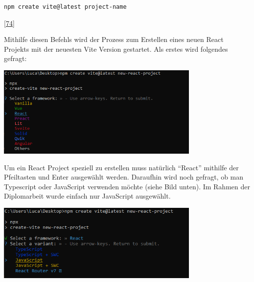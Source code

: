 \documentclass[
    headings=optiontotocandhead,%
    twoside,
    numbers=noenddot,%
    12pt, %
    titlepage, %
    parskip=full, %
    listof=leveldown, 
    numbers=noenddot, %
    a4paper,DIV=14,
    BCOR=15mm,
]{scrbook}
\let\origfigure=\figure
\let\endorigfigure=\endfigure
\renewenvironment{figure}[1][]{%
   \origfigure[H]
}{%
   \endorigfigure
}
\begin{document}
\begin{lstlisting}[caption={Befehl zum Erstellen eines React-Projekts mit Vite}]
npm create vite@latest project-name
\end{lstlisting}

{[}\protect\hyperlink{ref-React-CrashCourse}{74}{]}

Mithilfe diesen Befehls wird der Prozess zum Erstellen eines neuen React
Projekts mit der neuesten Vite Version gestartet. Als erstes wird
folgendes gefragt:

\begin{figure}
\centering
\includegraphics[width=0.75\textwidth,height=\textheight]{img/Gekle/CreateProject1.png}
\caption{Auswahl des Projekttyps nach npm Befehl}
\end{figure}

Um ein React Project speziell zu erstellen muss natürlich ``React''
mithilfe der Pfeiltasten und Enter ausgewählt werden. Daraufhin wird
noch gefragt, ob man Typescript oder JavaScript verwenden möchte (siehe
Bild unten). Im Rahmen der Diplomarbeit wurde einfach nur JavaScript
ausgewählt.

\begin{figure}
\centering
\includegraphics[width=0.75\textwidth,height=\textheight]{img/Gekle/CreateProject2.png}
\caption{Auswahl zwischen TypeScript und Javascript während der
Projekterstellung}
\end{figure}
\end{document}
